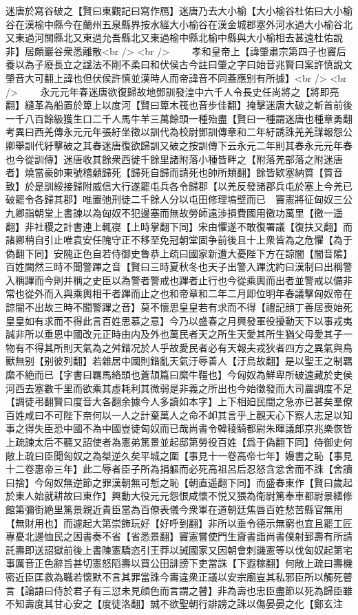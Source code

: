 迷唐於寫谷破之【賢曰東觀記曰寫作鴈】迷唐乃去大小榆【大小榆谷杜佑曰大小榆谷在漢榆中縣今在蘭州五泉縣界按水經大小榆谷在漢金城郡塞外河水過大小榆谷北又東過河關縣北又東過允吾縣北又東過榆中縣北榆中縣與大小榆相去甚遠杜佑說非】居頗巖谷衆悉離散<br />
<br />
　　孝和皇帝上【諱肇肅宗第四子也竇后養以為子廢長立之諡法不剛不柔曰和伏侯古今註曰肇之字曰始音兆賢曰案許慎說文肇音大可翻上諱也但伏侯許慎並漢時人而帝諱音不同蓋應别有所據】<br />
<br />
　　永元元年春迷唐欲復歸故地鄧訓發湟中六千人令長史任尚將之【將即亮翻】縫革為船置於箄上以度河【賢曰箄木筏也音步佳翻】掩擊迷唐大破之斬首前後一千八百餘級獲生口二千人馬牛羊三萬餘頭一種殆盡【賢曰一種謂迷唐也種章勇翻　考異曰西羌傳永元元年張紆坐徵以訓代為校尉鄧訓傳章和二年紆誘誅羌羌謀報怨公卿舉訓代紆擊破之其春迷唐復欲歸訓又破之按訓傳下云永元二年則其春永元元年春也今從訓傳】迷唐收其餘衆西徙千餘里諸附落小種皆畔之【附落羌部落之附迷唐者】燒當豪帥東號稽顙歸死【歸死自歸而請死也帥所類翻】餘皆欵塞納質【質音致】於是訓綏接歸附威信大行遂罷屯兵各令歸郡【以羌反發諸郡兵屯於塞上今羌已破罷令各歸其郡】唯置弛刑徒二千餘人分以屯田修理塢壁而已　竇憲將征匈奴三公九卿詣朝堂上書諫以為匈奴不犯邊塞而無故勞師遠涉損費國用徼功萬里【徼一遥翻】非社稷之計書連上輒寑【上時掌翻下同】宋由懼遂不敢復署議【復扶又翻】而諸卿稍自引止唯袁安任隗守正不移至免冠朝堂固争前後且十上衆皆為之危懼【為于偽翻下同】安隗正色自若侍御史魯恭上疏曰國家新遭大憂陛下方在諒闇【闇音隂】百姓闕然三時不聞警蹕之音【賢曰三時夏秋冬也天子出警入蹕沈約曰漢制曰出稱警入稱蹕而今則并稱之史臣以為警者警戒也蹕者止行也今從乘輿而出者並警戒以備非常也從外而入與乘輿相干者蹕而止之也和帝章和二年二月即位明年春議擊匈奴帝在諒闇不出故三時不聞警蹕之音】莫不懷思皇皇若有求而不得【禮記顔丁善居喪始死皇皇如有求而不得此言百姓思慕之意】今乃以盛春之月興發軍役擾動天下以事戎夷誠非所以垂恩中國改元正時由内及外也萬民者天之所生天愛其所生猶父母愛其子一物有不得其所則天氣為之舛錯况於人乎故愛民者必有天報夫戎狄者四方之異氣與鳥獸無别【别彼列翻】若雜居中國則錯亂天氣汙辱善人【汙烏故翻】是以聖王之制羈縻不絶而已【字書曰羈馬絡頭也蒼頡篇曰縻牛韁也】今匈奴為鮮卑所破遠藏於史侯河西去塞數千里而欲乘其虛耗利其微弱是非義之所出也今始徵發而大司農調度不足【調徒弔翻賢曰度音大各翻余據今人多讀如本字】上下相廹民間之急亦已甚矣羣僚百姓咸曰不可陛下奈何以一人之計棄萬人之命不卹其言乎上觀天心下察人志足以知事之得失臣恐中國不為中國豈徒匈奴而已哉尚書令韓稜騎都尉朱暉議郎京兆樂恢皆上疏諫太后不聽又詔使者為憲弟篤景並起邸第勞役百姓【爲于偽翻下同】侍御史何敞上疏曰臣聞匈奴之為桀逆久矣平城之圍【事見十一卷高帝七年】嫚書之恥【事見十二卷惠帝三年】此二辱者臣子所為捐軀而必死高祖呂后忍怒含忿舍而不誅【舍讀曰捨】今匈奴無逆節之罪漢朝無可慙之恥【朝直遥翻下同】而盛春東作【賢曰歲起於東人始就耕故曰東作】興動大役元元怨恨咸懷不悦又猥為衛尉篤奉車都尉景繕修館第彌街絶里篤景親近貴臣當為百僚表儀今衆軍在道朝廷焦唇百姓愁苦縣官無用【無財用也】而遽起大第崇飾玩好【好呼到翻】非所以垂令德示無窮也宜且罷工匠專憂北邊恤民之困書奏不省【省悉景翻】竇憲嘗使門生齎書詣尚書僕射郅壽有所請託壽即送詔獄前後上書陳憲驕恣引王莽以誡國家又因朝會刺譏憲等以伐匈奴起第宅事厲音正色辭旨甚切憲怒䧟壽以買公田誹謗下吏當誅【下遐稼翻】何敞上疏曰壽機密近臣匡救為職若懷默不言其罪當誅今壽違衆正議以安宗廟豈其私邪臣所以觸死瞽言【論語曰侍於君子有三愆未見顔色而言謂之瞽】非為壽也忠臣盡節以死為歸臣雖不知壽度其甘心安之【度徒洛翻】誠不欲聖朝行誹謗之誅以傷晏晏之化【鄭玄注
